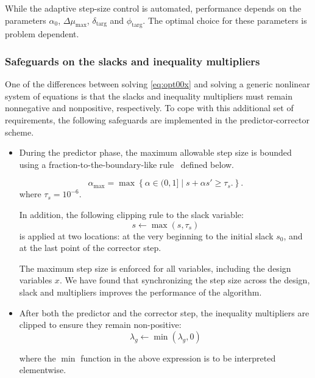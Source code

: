 \begin{remark}
  While the adaptive step-size control is automated, performance depends on the
  parameters $\alpha_0$, $\Delta \mu_{\max}$, $\delta_{\text{targ}}$ and
  $\phi_{\text{targ}}$.  The optimal choice for these parameters is problem
  dependent.
\end{remark}

\subsubsection{Safeguards on the slacks and inequality multipliers}\label{sec:fraction}
One of the differences between solving \eqref{eq:opt00x} and solving a generic
nonlinear system of equations is that the slacks and inequality multipliers must
remain nonnegative and nonpositive, respectively.  To cope with this additional
set of requirements, the following safeguards are implemented in the
predictor-corrector scheme.
\begin{itemize}
  \item During the predictor phase, the maximum allowable step size is bounded
    using a fraction-to-the-boundary-like rule~\cite{Nocedal2006NO} defined
    below.
    
  \begin{equation}\label{eq:f2b}
      \alpha_{\max} = \max\left\{
      \alpha \in (0,1] \;|\; s + \alpha s' \geq \tau_s .\right\}.
    \end{equation}
where $\tau_s = 10^{-6}$. 


In addition, the following clipping rule to the slack variable: 
\begin{equation}\label{eq:sclip}
    s \leftarrow \max(s, \tau_s)
\end{equation}
is applied at two locations: at the very beginning to the initial 
slack $s_0$, and at the last point of the corrector step. 

    The maximum step size is enforced for all variables, including the design
    variables $x$.  We have found that synchronizing the step size across the
    design, slack and multipliers improves the performance of the algorithm.
    
  \item After both the predictor and the corrector step,
  the inequality multipliers are clipped to
    ensure they remain non-positive:
    \begin{equation}\label{eq:lclip}
     \lambda_g \leftarrow \min(\lambda_g, 0)
    \end{equation}

    where the $\min$ function in the above expression is to be
    interpreted elementwise.  
\end{itemize}

